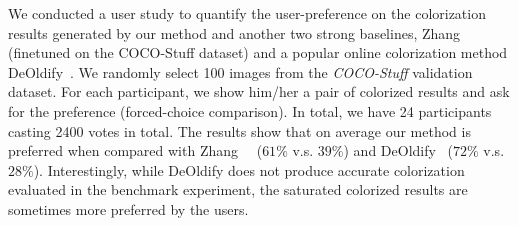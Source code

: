 \begin{table}[!t]
    \centering
    \caption{\textbf{Quantitative comparison at the instance level.} The methods in the first block are trained using the ImageNet dataset. The symbol $*$ denotes the methods that are finetuned on the COCO-Stuff training set.}
    \label{tab:instance_comp}
\end{table} 


We conducted a user study to quantify the user-preference on the colorization results generated by our method and another two strong baselines, Zhang~\etal~\cite{Zhang-SIGGRAPHASIA-2018} (finetuned on the COCO-Stuff dataset) and a popular online colorization method DeOldify~\cite{Deoldify}.
We randomly select 100 images from the \emph{COCO-Stuff} validation dataset.
For each participant, we show him/her a pair of colorized results and ask for the preference (forced-choice comparison).
In total, we have 24 participants casting 2400 votes in total.
The results show that on average our method is preferred when compared with Zhang~\etal~\cite{Zhang-SIGGRAPHASIA-2018} ($61\%$ v.s. $39\%$) and DeOldify~\cite{Deoldify} ($72\%$ v.s. $28\%$). 
Interestingly, while DeOldify does not produce accurate colorization evaluated in the benchmark experiment, the saturated colorized results are sometimes more preferred by the users.


